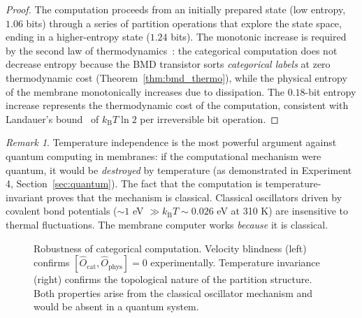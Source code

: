 \documentclass[12pt]{article}
\theoremstyle{definition}
\theoremstyle{remark}
\newtheorem{remark}[theorem]{Remark}
\newcommand{\Ocat}{\hat{O}_{\mathrm{cat}}}
\newcommand{\Ophys}{\hat{O}_{\mathrm{phys}}}
\newcommand{\kB}{k_{\mathrm{B}}}
\begin{document}
\begin{proof}
The computation proceeds from an initially prepared state (low entropy, $1.06$ bits) through a series of partition operations that explore the state space, ending in a higher-entropy state ($1.24$ bits). The monotonic increase is required by the second law of thermodynamics~\citep{boltzmann1896vorlesungen}: the categorical computation does not decrease entropy because the BMD transistor sorts \emph{categorical labels} at zero thermodynamic cost (Theorem~\ref{thm:bmd_thermo}), while the physical entropy of the membrane monotonically increases due to dissipation. The $0.18$-bit entropy increase represents the thermodynamic cost of the computation, consistent with Landauer's bound~\citep{landauer1961irreversibility} of $\kB T \ln 2$ per irreversible bit operation. \qedhere
\end{proof}

\begin{remark}
\label{rem:quantum_unnecessary}
Temperature independence is the most powerful argument against quantum computing in membranes: if the computational mechanism were quantum, it would be \emph{destroyed} by temperature (as demonstrated in Experiment 4, Section~\ref{sec:quantum}). The fact that the computation is temperature-invariant proves that the mechanism is classical. Classical oscillators driven by covalent bond potentials ($\sim 1$ eV $\gg \kB T \sim 0.026$ eV at 310 K) are insensitive to thermal fluctuations. The membrane computer works \emph{because} it is classical.
\end{remark}

\begin{figure}[H]
\centering
{}
\caption{Robustness of categorical computation. Velocity blindness (left) confirms $[\Ocat, \Ophys] = 0$ experimentally. Temperature invariance (right) confirms the topological nature of the partition structure. Both properties arise from the classical oscillator mechanism and would be absent in a quantum system.}
\label{fig:robustness}
\end{figure}


\end{document}
